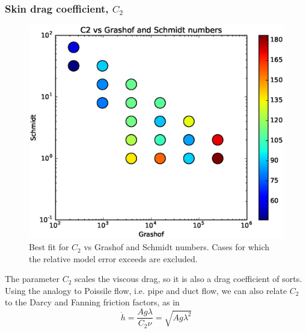 \subsubsection{Skin drag coefficient, $C_2$}
\begin{figure}
\includegraphics[width=\columnwidth]{figs/C2-vs-Grashof-Schmidt}
\caption{ 
  Best fit for $C_2$ vs Grashof and Schmidt numbers.
  Cases for which the relative model error exceeds \fittol are excluded.
}
\end{figure}

The parameter $C_2$ scales the viscous drag, so it is also a drag coefficient of sorts.
Using the analogy to Poissile flow, i.e. pipe and duct flow, we can also relate $C_2$ to the Darcy and Fanning friction factors, as in 
\begin{equation}
\dot{h} = \frac{A g \lambda}{C_2 \nu} = \sqrt{A g \lambda^2 }
\end{equation}

